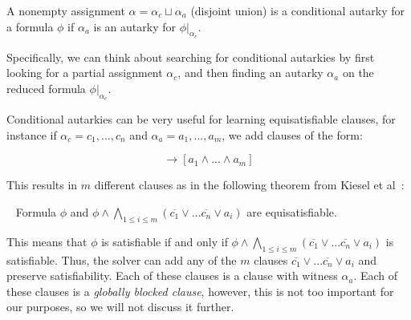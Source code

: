 \begin{definition}
    A nonempty assignment $\alpha = \alpha_c \sqcup \alpha_a$ (disjoint union) is a conditional autarky for a formula $\phi$ if $\alpha_a$ is an autarky for $\phi|_{\alpha_c}$.
\end{definition}

Specifically, we can think about searching for conditional autarkies by first looking for a partial assignment $\alpha_c$, and then finding an autarky $\alpha_a$ on the reduced formula $\phi|_{\alpha_c}$.

Conditional autarkies can be very useful for learning equisatisfiable clauses, for instance if $\alpha_c = c_1, ..., c_n$ and $\alpha_a = a_1, ..., a_m$, we add clauses of the form:

\begin{equation*}
    [c_1 \land ... \land c_n] \rightarrow [a_1 \land ... \land a_m]
\end{equation*}

This results in $m$ different clauses as in the following theorem from Kiesel et al~\cite{conditionalautarkies}:

\begin{theorem}~\label{thm:gbcequisat}
    Formula $\phi$ and $\phi \land \bigwedge_{1 \leq i \leq m} (\overline{c_1} \lor ... \overline{c_n} \lor a_i)$ are equisatisfiable.
\end{theorem}

This means that $\phi$ is satisfiable if and only if $\phi \land \bigwedge_{1 \leq i \leq m} (\overline{c_1} \lor ... \overline{c_n} \lor a_i)$ is satisfiable. Thus, the solver can add any of the $m$ clauses $\overline{c_1} \lor ... \overline{c_n} \lor a_i$ and preserve satisfiability. Each of these clauses is a \pr clause with witness $\alpha_a$. Each of these clauses is a \emph{globally blocked clause}, however, this is not too important for our purposes, so we will not discuss it further.



   
